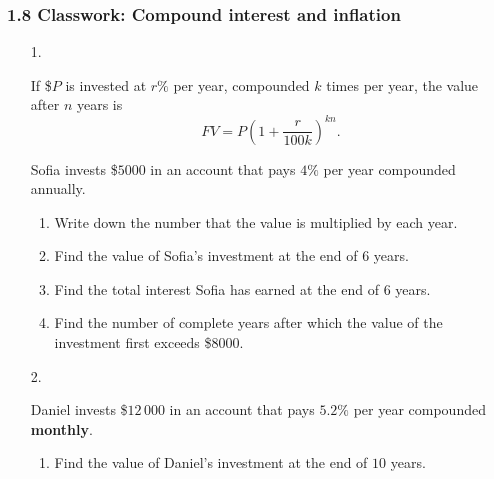 \documentclass[12pt, twoside]{article}
\begin{document}
\subsubsection*{1.8 Classwork: Compound interest and inflation}

\begin{enumerate}[itemsep=0.15cm]

\item[1.]

If \$$P$ is invested at $r\%$ per year, compounded $k$ times per year,
the value after $n$ years is
$$FV = P\left(1 + \frac{r}{100k}\right)^{kn}.$$

Sofia invests \$$5000$ in an account that pays $4\%$ per year compounded
annually.

\begin{enumerate}[itemsep=0.1cm]
  \item Write down the number that the value is multiplied by each year.
  \item Find the value of Sofia's investment at the end of $6$ years.
  \item Find the total interest Sofia has earned at the end of $6$ years.
  \item Find the number of complete years after which the value of the
  investment first exceeds \$$8000$.
\end{enumerate}


\newpage

\item[2.]

Daniel invests \$$12\,000$ in an account that pays $5.2\%$ per year
compounded \textbf{monthly}.

\begin{enumerate}[itemsep=0.1cm]
  \item Find the value of Daniel's investment at the end of $10$ years.
\end{enumerate}


\end{enumerate}
\end{document}
